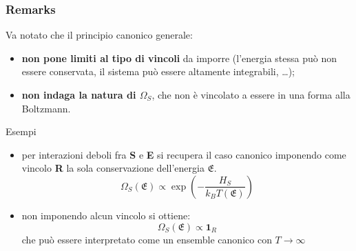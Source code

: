 \documentclass[10pt]{beamer}
\theoremstyle{definition}
\theoremstyle{plain}
\begin{document}
\begin{frame}
	\frametitle{Remarks}
	
	Va notato che il principio canonico generale: %
	\begin{itemize}
		\item \textbf{non pone limiti al tipo di vincoli} da imporre (l'energia stessa può non essere conservata, il sistema può essere altamente integrabili, \dots);
		\item \textbf{non indaga la natura di $\Omega_S$}, che non è vincolato a essere in una forma alla Boltzmann.
	\end{itemize}

	\pause
	\begin{exampleblock}{Esempi}
		\begin{itemize}
			\item per interazioni deboli fra \textbf{S} e \textbf{E} si recupera il caso canonico imponendo come vincolo \textbf{R} la sola conservazione dell'energia $\mathfrak{E}$.
			\begin{equation*}
				\Omega_S(\mathfrak{E}) \propto \exp\left( - \frac{H_S}{k_B T(\mathfrak{E})}\right)
			\end{equation*}
			\pause
			\item non imponendo alcun vincolo si ottiene:
			\begin{equation*}
			\Omega_S(\mathfrak{E}) \propto \mathbf{1}_R
			\end{equation*}
			che può essere interpretato come un ensemble canonico con $T \rightarrow \infty$
		\end{itemize}
	\end{exampleblock}
\end{frame}
%
%	
%	
\end{document}
